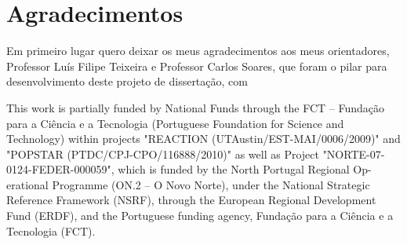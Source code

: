 \chapter*{Agradecimentos}

Em primeiro lugar quero deixar os meus agradecimentos aos meus orientadores, Professor Luís Filipe Teixeira e Professor Carlos Soares, que foram o pilar para desenvolvimento deste projeto de dissertação, com 


\vspace{10mm}

\vfill

This work is partially funded by National Funds through the FCT – Fundação para a Ciência e a Tecnologia (Portuguese Foundation for Science and Technology) within projects "REACTION (UTAustin/EST-MAI/0006/2009)" and "POPSTAR (PTDC/CPJ-CPO/116888/2010)" as well as Project "NORTE-07-0124-FEDER-000059", which is funded by the North Portugal Regional Op- erational Programme (ON.2 – O Novo Norte), under the National Strategic Reference Framework (NSRF), through the European Regional Development Fund (ERDF), and the Portuguese funding agency, Fundação para a Ciência e a Tecnologia (FCT). 